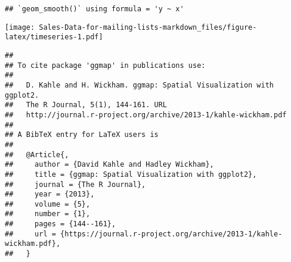 \documentclass[
]{article}
\begin{document}
\begin{verbatim}
## `geom_smooth()` using formula = 'y ~ x'
\end{verbatim}

\texttt{[image: Sales-Data-for-mailing-lists-markdown\_files/figure-latex/timeseries-1.pdf]}

\begin{verbatim}
## 
## To cite package 'ggmap' in publications use:
## 
##   D. Kahle and H. Wickham. ggmap: Spatial Visualization with ggplot2.
##   The R Journal, 5(1), 144-161. URL
##   http://journal.r-project.org/archive/2013-1/kahle-wickham.pdf
## 
## A BibTeX entry for LaTeX users is
## 
##   @Article{,
##     author = {David Kahle and Hadley Wickham},
##     title = {ggmap: Spatial Visualization with ggplot2},
##     journal = {The R Journal},
##     year = {2013},
##     volume = {5},
##     number = {1},
##     pages = {144--161},
##     url = {https://journal.r-project.org/archive/2013-1/kahle-wickham.pdf},
##   }
\end{verbatim}
\end{document}
